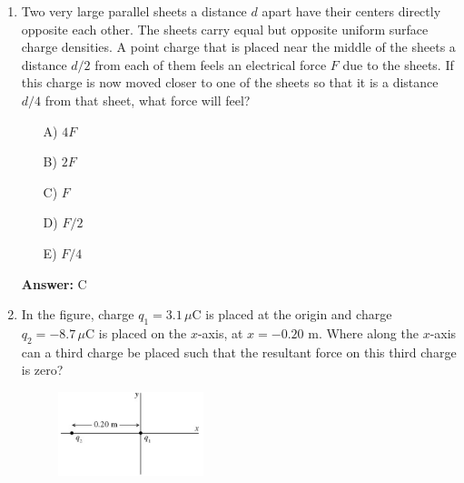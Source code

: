 \begin{enumerate}
    \begin{multicols}{5}
    \begin{itemize}
        \item[A)] Only regions $X$ and $Z$
        \item[B)] Only region $X$
        \item[C)] Only region $Y$
        \item[D)] Only region $Z$
        \item[E)] All three regions
    \end{itemize}
    \end{multicols}

    \textbf{Answer:} B

    \item Two very large parallel sheets a distance $d$ apart have their centers directly opposite each other. The sheets carry equal but opposite uniform surface charge densities. A point charge that is placed near the middle of the sheets a distance $d/2$ from each of them feels an electrical force $F$ due to the sheets. If this charge is now moved closer to one of the sheets so that it is a distance $d/4$ from that sheet, what force will feel?

    \begin{multicols}{5}
    \begin{itemize}
        \item[A)] $4F$
        \item[B)] $2F$
        \item[C)] $F$
        \item[D)] $F/2$
        \item[E)] $F/4$
    \end{itemize}
    \end{multicols}

    \textbf{Answer:} C

    \item In the figure, charge $q_1=3.1\,\mu$C is placed at the origin and charge $q_2=-8.7\,\mu$C is placed on the $x$-axis, at $x = -0.20$ m. Where along the $x$-axis can a third charge be placed such that the resultant force on this third charge is zero?

    \begin{figure}[H]
        \centering
        \includegraphics[width=0.4\textwidth,height=0.2\textwidth]{figures-workshop01/problem-5.png}
    \end{figure}


\end{enumerate}

